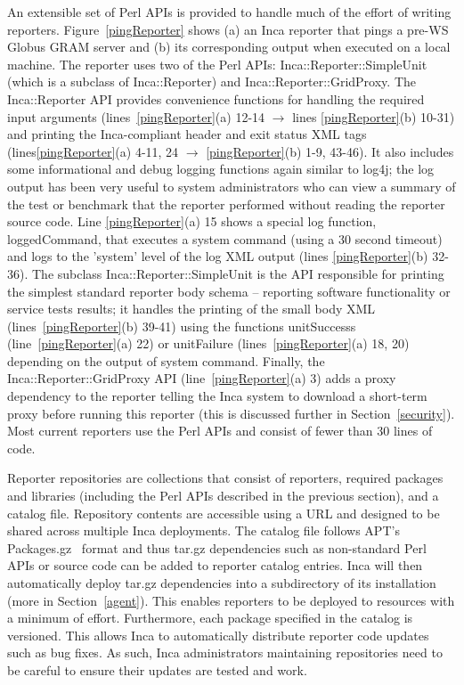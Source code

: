 \documentclass[times,10pt,twocolumn]{article}
\begin{document}
An extensible set of Perl APIs is provided to handle much of the effort of
writing reporters.  Figure~\ref{pingReporter} shows (a) an Inca reporter that
pings a pre-WS Globus GRAM server and (b) its corresponding output when
executed on a local machine.  The reporter uses two of the Perl APIs:
Inca::Reporter::SimpleUnit (which is a subclass of Inca::Reporter) and
Inca::Reporter::GridProxy.  The Inca::Reporter API provides convenience
functions for handling the required input arguments
(lines~\ref{pingReporter}(a) 12-14 $\rightarrow$ lines \ref{pingReporter}(b)
10-31) and printing the Inca-compliant header and exit status XML tags
(lines\ref{pingReporter}(a) 4-11, 24 $\rightarrow$ \ref{pingReporter}(b)
1-9, 43-46).  It also includes some informational and debug logging functions
again similar to log4j; the log output has been very useful to system
administrators who can view a summary of the test or benchmark that the
reporter performed without reading the reporter source code.  Line
\ref{pingReporter}(a) 15 shows a special log function, loggedCommand, that
executes a system command (using a 30 second timeout) and logs to the 'system'
level of the log XML output (lines \ref{pingReporter}(b) 32-36).  The subclass
Inca::Reporter::SimpleUnit is the API responsible for printing the simplest
standard reporter body schema -- reporting software functionality or service
tests results; it handles the printing of the small body XML
(lines~\ref{pingReporter}(b) 39-41) using the functions unitSuccesss
(line~\ref{pingReporter}(a) 22) or unitFailure (lines~\ref{pingReporter}(a)
18, 20) depending on the output of system command.  Finally, the
Inca::Reporter::GridProxy API (line~\ref{pingReporter}(a) 3) adds a proxy
dependency to the reporter telling the Inca system to download a
short-term proxy before running this reporter (this is discussed further in
Section~\ref{security}).  Most current reporters use the Perl APIs and consist
of fewer than 30 lines of code.


Reporter repositories are collections that consist of reporters, required
packages and libraries (including the Perl APIs described in the previous
section), and a catalog file.  Repository contents are accessible using a URL
and designed to be shared across multiple Inca deployments.  The catalog file
follows APT's Packages.gz~\cite{apt} format and thus tar.gz dependencies such
as non-standard Perl APIs or source code can be added to reporter catalog
entries.  Inca will then automatically deploy tar.gz dependencies into a
subdirectory of its installation (more in Section~\ref{agent}).  This enables
reporters to be deployed to resources with a minimum of effort.  Furthermore,
each package specified in the catalog is versioned.  This allows Inca to
automatically distribute reporter code updates such as bug fixes.  As such,
Inca administrators maintaining repositories need to be careful to ensure
their updates are tested and work.
\end{document}
